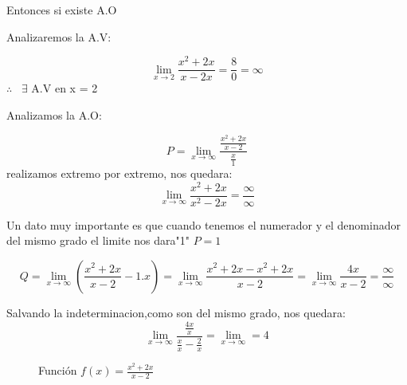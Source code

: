 \documentclass{article}
\begin{document}
Entonces si existe A.O

Analizaremos la A.V:

$$ \lim_{x \to 2} \frac{x^2+2x}{x-2x} = \frac{8}{0} = \infty $$ $\therefore$ \ $\exists$ A.V en x = 2

Analizamos la A.O:

$$ P = \lim_{x \to \infty} \frac{\frac{x^2+2x}{x-2}}{\frac{x}{1}} $$
realizamos extremo por extremo, nos quedara: 
$$ \lim_{x \to \infty} \frac{x^2+2x}{x^2-2x} = \frac{\infty}{\infty}$$

Un dato muy importante es que cuando tenemos el numerador y el denominador del mismo grado 
el limite nos dara"1"
$P=1$

$$Q= \lim_{x \to \infty} \left(\frac{x^2+2x}{x-2}-1.x\right)= \lim_{x \to \infty} \frac{x^2+2x-x^2+2x}{x-2}= \lim_{x \to \infty} \frac{4x}{x-2} = \frac{\infty}{\infty}$$

Salvando la indeterminacion,como son del mismo grado, nos quedara:
$$ \lim_{x \to \infty} \frac{\frac{4x}{x}}{\frac{x}{x}-\frac{2}{x}} = \lim_{x \to \infty} = 4$$ 

\begin{center}
\begin{figure}[h!]
    \center
    \caption{Funci\'on $f(x) = \frac{x^2+2x}{x-2}$}
\end{figure}
\end{center}
\end{document}
